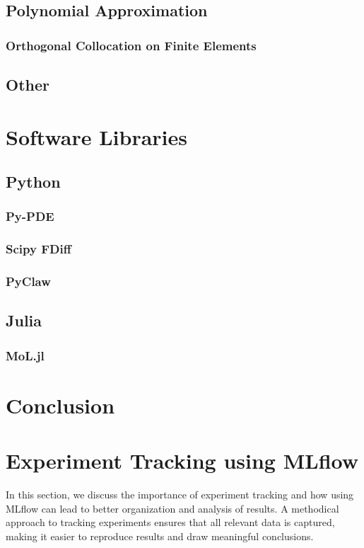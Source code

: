 \documentclass{article}
\begin{document}
\subsection{Polynomial Approximation}
\subsubsection{Orthogonal Collocation on Finite Elements}
\subsection{Other}

\section{Software Libraries}

\subsection{Python}
\subsubsection{Py-PDE}
\subsubsection{Scipy FDiff}
\subsubsection{PyClaw}
\subsection{Julia}
\subsubsection{MoL.jl}

\section{Conclusion}

\newpage{}





\appendix
\section{Experiment Tracking using MLflow}
In this section, we discuss the importance of experiment tracking and how using MLflow can lead to better organization and analysis of results. A methodical approach to tracking experiments ensures that all relevant data is captured, making it easier to reproduce results and draw meaningful conclusions.
\end{document}
